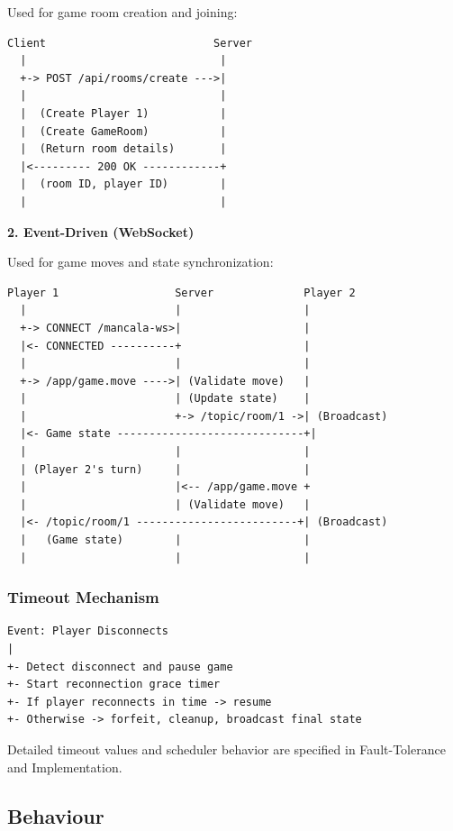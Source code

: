 \documentclass{scrartcl}
\begin{document}
Used for game room creation and joining:

\begin{lstlisting}
Client                          Server
  |                              |
  +-> POST /api/rooms/create --->|
  |                              |
  |  (Create Player 1)           |
  |  (Create GameRoom)           |
  |  (Return room details)       |
  |<--------- 200 OK ------------+
  |  (room ID, player ID)        |
  |                              |
\end{lstlisting}

\textbf{2. Event-Driven (WebSocket)}

Used for game moves and state synchronization:

\begin{lstlisting}
Player 1                  Server              Player 2
  |                       |                   |
  +-> CONNECT /mancala-ws>|                   |
  |<- CONNECTED ----------+                   |
  |                       |                   |
  +-> /app/game.move ---->| (Validate move)   |
  |                       | (Update state)    |
  |                       +-> /topic/room/1 ->| (Broadcast)
  |<- Game state -----------------------------+|
  |                       |                   |
  | (Player 2's turn)     |                   |
  |                       |<-- /app/game.move +
  |                       | (Validate move)   |
  |<- /topic/room/1 -------------------------+| (Broadcast)
  |   (Game state)        |                   |
  |                       |                   |
\end{lstlisting}

\subsubsection{Timeout Mechanism}

\begin{lstlisting}
Event: Player Disconnects
|
+- Detect disconnect and pause game
+- Start reconnection grace timer
+- If player reconnects in time -> resume
+- Otherwise -> forfeit, cleanup, broadcast final state
\end{lstlisting}

Detailed timeout values and scheduler behavior are specified in Fault-Tolerance and Implementation.

\subsection{Behaviour}\label{behaviour}
\end{document}
